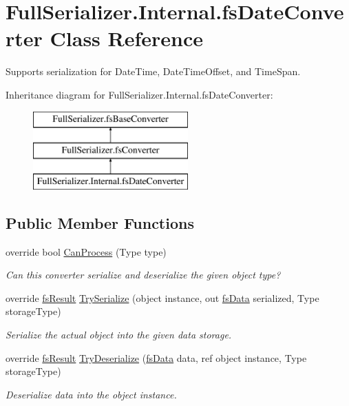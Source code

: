 \hypertarget{class_full_serializer_1_1_internal_1_1fs_date_converter}{}\section{Full\+Serializer.\+Internal.\+fs\+Date\+Converter Class Reference}
\label{class_full_serializer_1_1_internal_1_1fs_date_converter}


Supports serialization for Date\+Time, Date\+Time\+Offset, and Time\+Span.  


Inheritance diagram for Full\+Serializer.\+Internal.\+fs\+Date\+Converter\+:\begin{figure}[H]
\begin{center}
\leavevmode
\includegraphics[height=3.000000cm]{class_full_serializer_1_1_internal_1_1fs_date_converter}
\end{center}
\end{figure}
\subsection*{Public Member Functions}
\begin{DoxyCompactItemize}
\item 
override bool \hyperlink{class_full_serializer_1_1_internal_1_1fs_date_converter_a4728edb68d03760970cb536f9c376cc0}{Can\+Process} (Type type)
\begin{DoxyCompactList}\small\item\em Can this converter serialize and deserialize the given object type? \end{DoxyCompactList}\item 
override \hyperlink{struct_full_serializer_1_1fs_result}{fs\+Result} \hyperlink{class_full_serializer_1_1_internal_1_1fs_date_converter_a4e7733527b03e6a6f8381d3f79b6ac79}{Try\+Serialize} (object instance, out \hyperlink{class_full_serializer_1_1fs_data}{fs\+Data} serialized, Type storage\+Type)
\begin{DoxyCompactList}\small\item\em Serialize the actual object into the given data storage. \end{DoxyCompactList}\item 
override \hyperlink{struct_full_serializer_1_1fs_result}{fs\+Result} \hyperlink{class_full_serializer_1_1_internal_1_1fs_date_converter_ad439c675a33e91ca71370886f113e459}{Try\+Deserialize} (\hyperlink{class_full_serializer_1_1fs_data}{fs\+Data} data, ref object instance, Type storage\+Type)
\begin{DoxyCompactList}\small\item\em Deserialize data into the object instance. \end{DoxyCompactList}\end{DoxyCompactItemize}
